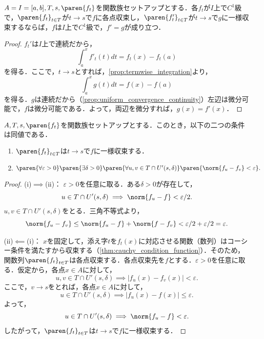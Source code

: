\documentclass[a4paper,10pt]{ltjsarticle}
\begin{document}
\begin{MyProposition}
  \(A = I = [a, b], T, s, \paren{f_t}\)を関数族セットアップとする．各\(f_t\)が\(I\)上で\(C^1\)級で，\(\paren{f_t}_{t\in T}\)が\(t \to s\)で\(f\)に各点収束し，\(\paren{f_t'}_{t\in T}\)が\(t \to s\)で\(g\)に一様収束するならば，\(f\)は\(I\)上で\(C^1\)級で，\(f' = g\)が成り立つ．
\end{MyProposition}
\begin{proof}
  \(f_t'\)は\(I\)上で連続だから，
  \[ \int_a^x f'_t(t)dt = f_t(x) - f_t(a) \]
  を得る．ここで，\(t \to s\)とすれば，\cref{prop:termwise_integration}より，
  \[ \int_a^x g(t)dt = f(x) - f(a) \]
  を得る．\(g\)は連続だから（\cref{prop:uniform_convergence_continuity}）左辺は微分可能で，\(f\)は微分可能である．よって，両辺を微分すれば，\(g(x) = f'(x)\)．
\end{proof}

\begin{MyTheorem}
  \(A, T, s, \paren{f_t}\)を関数族セットアップとする．このとき，以下の二つの条件は同値である．
  \begin{enumerate}
    \item \(\paren{f_t}_{t\in T}\)は\(t \to s\)で\(f\)に一様収束する．
    \item \(\paren{\forall \varepsilon > 0}\paren{\exists \delta > 0}\paren{\forall u, v \in T \cap U'(s, \delta)}\paren{\norm{f_u - f_v} < \varepsilon}.\)
  \end{enumerate}
\end{MyTheorem}
\begin{proof}
  (i)\(\implies\)(ii)： \(\varepsilon > 0\)を任意に取る．ある\(\delta > 0\)が存在して，
  \[ u \in T \cap U'(s, \delta) \implies \norm{f_u - f} < \varepsilon/2. \]
  \(u, v \in T \cap U'(s, \delta)\)をとる．三角不等式より，
  \[ \norm{f_u - f_v} \le \norm{f_u - f} + \norm{f - f_v} < \varepsilon/2 + \varepsilon/2 = \varepsilon. \]

  (ii)\(\impliedby\)(i)： \(x\)を固定して，添え字\(t\)を\(f_t(x)\)に対応させる関数（数列）はコーシー条件を満たすから収束する（\cref{thm:cauchy_condition_function}）．そのため，関数列\(\paren{f_t}_{t\in T}\)は各点収束する．各点収束先を\(f\)とする．\(\varepsilon > 0\)を任意に取る．仮定から，各点\(x \in A\)に対して，
  \[ u, v \in T \cap U'(s, \delta) \implies |f_u(x) - f_v(x)| < \varepsilon. \]
  ここで，\(v \to s\)をとれば，各点\(x \in A\)に対して，
  \[ u \in T \cap U'(s, \delta) \implies |f_u(x) - f(x)| \le \varepsilon. \]
  よって，
  \[ u \in T \cap U'(s, \delta) \implies \norm{f_u - f} < \varepsilon. \]
  したがって，\(\paren{f_t}_{t\in T}\)は\(t \to s\)で\(f\)に一様収束する．
\end{proof}
\end{document}

